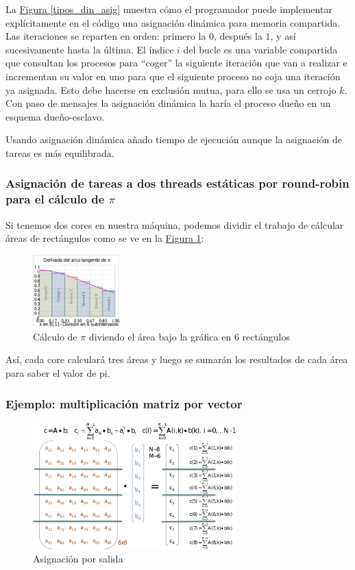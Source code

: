 \documentclass[10pt,a4paper,spanish]{report}
\begin{document}
La \hyperref[tipos_din_asig]{Figura \ref*{tipos_din_asig}} muestra cómo el programador puede implementar explícitamente en el código una asignación dinámica para memoria compartida. Las iteraciones se reparten en orden: primero la $0$, después la $1$, y así sucesivamente hasta la última. El índice $i$ del bucle es una variable compartida que consultan los procesos para ``coger'' la siguiente iteración que van a realizar e incrementan su valor en uno para que el siguiente proceso no coja una iteración ya asignada. Esto debe hacerse en exclusión mutua, para ello se usa un cerrojo $k$. Con paso de mensajes la asignación dinámica la haría el proceso dueño en un esquema dueño-esclavo.

Usando asignación dinámica añado tiempo de ejecución aunque la asignación de tareas es más equilibrada.

\textcolor[rgb]{0.2,0.4,0.8}{\subsubsection{Asignación de tareas a dos threads estáticas por round-robin para el cálculo de $\pi$}}
Si tenemos dos cores en nuestra máquina, podemos dividir el trabajo de cálcular áreas de rectángulos como se ve en la \hyperref[calculo_pi]{Figura \ref*{calculo_pi}}:

\begin{figure}[!h]
\centering
\includegraphics[width=0.3\textwidth]{47}
\caption{Cálculo de $\pi$ diviendo el área bajo la gráfica en 6 rectángulos}
\label{calculo_pi}
\end{figure}

Así, cada core calculará tres áreas y luego se sumarán los resultados de cada área para saber el valor de pi.

\textcolor[rgb]{0.2,0.4,0.8}{\subsubsection{Ejemplo: multiplicación matriz por vector}}
\begin{figure}[!h]
    \centering
    \includegraphics[width=0.7\textwidth]{45}
    \caption{Asignación por salida}
    \label{asig_filas}
\end{figure}
\end{document}
